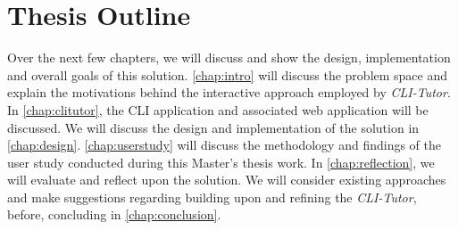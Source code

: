 \section{Thesis Outline}

Over the next few chapters, we will discuss and show the design, implementation
and overall goals of this solution. \autoref{chap:intro} will discuss the
problem space and explain the motivations behind the interactive approach
employed by \textit{CLI-Tutor}. In \autoref{chap:clitutor}, the CLI application
and associated web application will be discussed. We will discuss the design
and implementation of the solution in \autoref{chap:design}.
\autoref{chap:userstudy} will discuss the methodology and findings of the user
study conducted during this Master's thesis work. In \autoref{chap:reflection},
we will evaluate and reflect upon the solution. We will consider existing
approaches and make suggestions regarding building upon and refining the
\textit{CLI-Tutor}, before, concluding in \autoref{chap:conclusion}.

